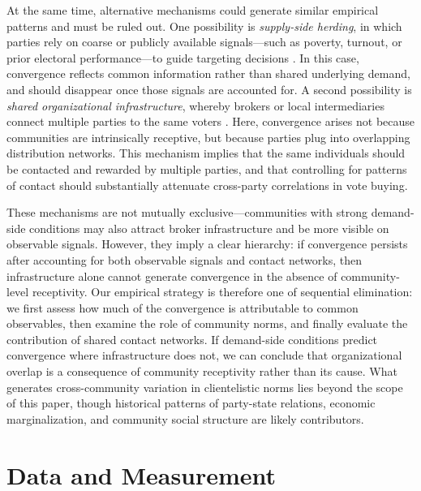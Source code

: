 \documentclass[12pt,letterpaper]{article}
\begin{document}
At the same time, alternative mechanisms could generate similar empirical patterns and must be ruled out. One possibility is \textit{supply-side herding}, in which parties rely on coarse or publicly available signals---such as poverty, turnout, or prior electoral performance---to guide targeting decisions \citep{magaloni2007clientelism}. In this case, convergence reflects common information rather than shared underlying demand, and should disappear once those signals are accounted for. A second possibility is \textit{shared organizational infrastructure}, whereby brokers or local intermediaries connect multiple parties to the same voters \citep{zarazaga2014brokers, holland2015beyond}. Here, convergence arises not because communities are intrinsically receptive, but because parties plug into overlapping distribution networks. This mechanism implies that the same individuals should be contacted and rewarded by multiple parties, and that controlling for patterns of contact should substantially attenuate cross-party correlations in vote buying.

These mechanisms are not mutually exclusive---communities with strong demand-side conditions may also attract broker infrastructure and be more visible on observable signals. However, they imply a clear hierarchy: if convergence persists after accounting for both observable signals and contact networks, then infrastructure alone cannot generate convergence in the absence of community-level receptivity. Our empirical strategy is therefore one of sequential elimination: we first assess how much of the convergence is attributable to common observables, then examine the role of community norms, and finally evaluate the contribution of shared contact networks. If demand-side conditions predict convergence where infrastructure does not, we can conclude that organizational overlap is a consequence of community receptivity rather than its cause. What generates cross-community variation in clientelistic norms lies beyond the scope of this paper, though historical patterns of party-state relations, economic marginalization, and community social structure are likely contributors.


\section{Data and Measurement}
\end{document}
